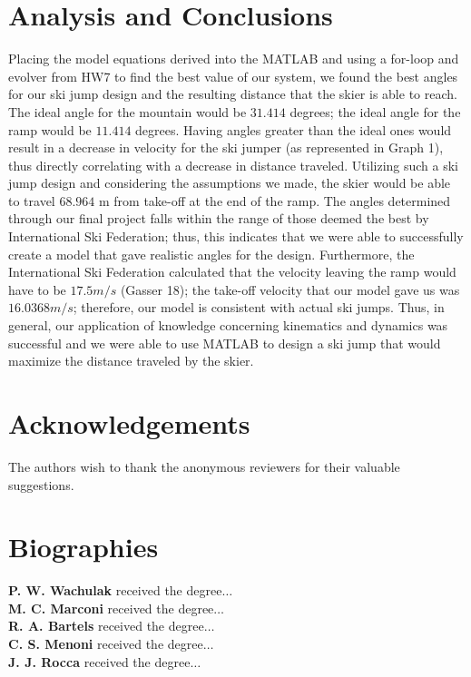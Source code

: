\documentclass[]{IEEEphot}
\begin{document}
\section{Analysis and Conclusions}

Placing the model equations derived into the MATLAB and using a for-loop and evolver from HW7 to find the best value of our system, we found the best angles for our ski jump design and the resulting distance that the skier is able to reach. The ideal angle for the mountain would be $31.414$ degrees; the ideal angle for the ramp would be $11.414$ degrees. Having angles greater than the ideal ones would result in a decrease in velocity for the ski jumper (as represented in Graph 1), thus directly correlating with a decrease in distance traveled. Utilizing such a ski jump design and considering the assumptions we made, the skier would be able to travel $68.964$ m from take-off at the end of the ramp. The angles determined through our final project falls within the range of those deemed the best by International Ski Federation; thus, this indicates that we were able to successfully create a model that gave realistic angles for the design. Furthermore, the International Ski Federation calculated that the velocity leaving the ramp would have to be $17.5 m/s$ (Gasser 18); the take-off velocity that our model gave us was $16.0368 m/s$; therefore, our model is consistent with actual ski jumps. Thus, in general, our application of knowledge concerning kinematics and dynamics was successful and we were able to use MATLAB to design a ski jump that would maximize the distance traveled by the skier.


\section*{Acknowledgements}
The authors wish to thank the anonymous reviewers for their valuable suggestions.  


\section*{Biographies}

\textbf{P. W. Wachulak} received the degree${\ldots}$ \\[6pt]
\textbf{M. C. Marconi} received the degree${\ldots}$ \\[6pt]
\textbf{R. A. Bartels} received the degree${\ldots}$ \\[6pt]
\textbf{C. S. Menoni} received the degree${\ldots}$ \\[6pt]
\textbf{J. J. Rocca} received the degree${\ldots}$
\end{document}
